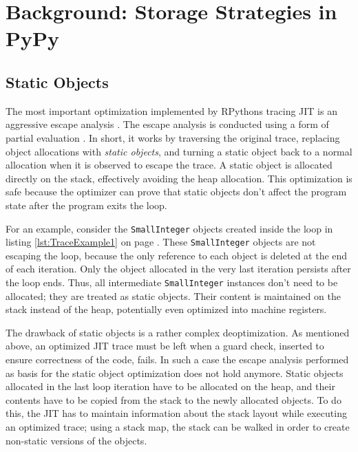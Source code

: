 \section{Background: Storage Strategies in PyPy}



\subsection{Static Objects}
\label{cha:staticObjects}


The most important optimization implemented by RPythons tracing JIT is an aggressive escape analysis \cite{escapeAnalysis}.
The escape analysis is conducted using a form of partial evaluation \cite{allocRemJIT}.
In short, it works by traversing the original trace, replacing object allocations with \emph{static objects}, and turning a static object back to a normal allocation when it is observed to escape the trace.
A static object is allocated directly on the stack, effectively avoiding the heap allocation.
This optimization is safe because the optimizer can prove that static objects don't affect the program state after the program exits the loop.

For an example, consider the \lstinline{SmallInteger} objects created inside the loop in listing \ref{lst:TraceExample1} on page \pageref{lst:TraceExample1}.
These \lstinline{SmallInteger} objects are not escaping the loop, because the only reference to each object is deleted at the end of each iteration.
Only the object allocated in the very last iteration persists after the loop ends.
Thus, all intermediate \lstinline{SmallInteger} instances don't need to be allocated; they are treated as static objects.
Their content is maintained on the stack instead of the heap, potentially even optimized into machine registers.

The drawback of static objects is a rather complex deoptimization.
As mentioned above, an optimized JIT trace must be left when a guard check, inserted to ensure correctness of the code, fails.
In such a case the escape analysis performed as basis for the static object optimization does not hold anymore.
Static objects allocated in the last loop iteration have to be allocated on the heap, and their contents have to be copied from the stack to the newly allocated objects.
To do this, the JIT has to maintain information about the stack layout while executing an optimized trace; using a stack map, the stack can be walked in order to create non-static versions of the objects.

